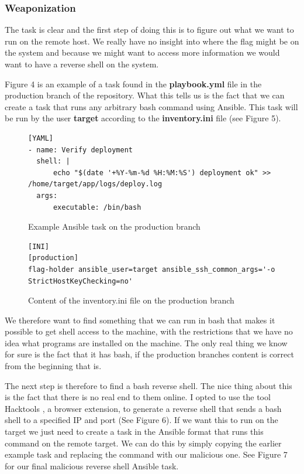 \documentclass{article}
\begin{document}
\subsubsection{Weaponization}

The task is clear and the first step of doing this is to figure out what we want to run on the remote host. We really have no insight into where the flag might be on the system and because we might want to access more information we would want to have a reverse shell on the system. 

Figure 4 is an example of a task found in the \textbf{playbook.yml} file in the production branch of the repository. What this tells us is the fact that we can create a task that runs any arbitrary bash command using Ansible. This task will be run by the user \textbf{target} according to the \textbf{inventory.ini} file (see Figure 5).

\begin{figure}
{\small\begin{verbatim}
[YAML]
- name: Verify deployment
  shell: |
      echo "$(date '+%Y-%m-%d %H:%M:%S') deployment ok" >> /home/target/app/logs/deploy.log
  args:
      executable: /bin/bash
\end{verbatim}}
    \caption{Example Ansible task on the production branch}
    \label{fig:example-task}
\end{figure}

\begin{figure}
{\small\begin{verbatim}
[INI]
[production]
flag-holder ansible_user=target ansible_ssh_common_args='-o StrictHostKeyChecking=no'
\end{verbatim}}
    \caption{Content of the inventory.ini file on the production branch}
    \label{fig:inventory}
\end{figure}

We therefore want to find something that we can run in bash that makes it possible to get shell access to the machine, with the restrictions that we have no idea what programs are installed on the machine. The only real thing we know for sure is the fact that it has bash, if the production branches content is correct from the beginning that is.

The next step is therefore to find a bash reverse shell. The nice thing about this is the fact that there is no real end to them online. I opted to use the tool Hacktools \cite{hacktools}, a browser extension, to generate a reverse shell that sends a bash shell to a specified IP and port (See Figure 6). If we want this to run on the target we just need to create a task in the Ansible format that runs this command on the remote target. We can do this by simply copying the earlier example task and replacing the command with our malicious one. See Figure 7 for our final malicious reverse shell Ansible task.
\end{document}
